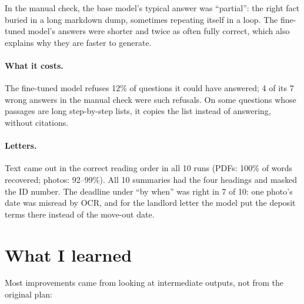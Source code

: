 \documentclass[11pt]{article}
\begin{document}
In the manual check, the base model's typical answer was ``partial'': the right fact buried in a long markdown dump, sometimes repeating itself in a loop. The fine-tuned model's answers were shorter and twice as often fully correct, which also explains why they are faster to generate.

\paragraph{What it costs.} The fine-tuned model refuses 12\% of questions it could have answered; 4 of its 7 wrong answers in the manual check were such refusals. On some questions whose passages are long step-by-step lists, it copies the list instead of answering, without citations.

\paragraph{Letters.} Text came out in the correct reading order in all 10 runs (PDFs: 100\% of words recovered; photos: 92--99\%). All 10 summaries had the four headings and masked the ID number. The deadline under ``by when'' was right in 7 of 10: one photo's date was misread by OCR, and for the landlord letter the model put the deposit terms there instead of the move-out date.

\section{What I learned}
\label{sec:lessons}

Most improvements came from looking at intermediate outputs, not from the original plan:
\end{document}
